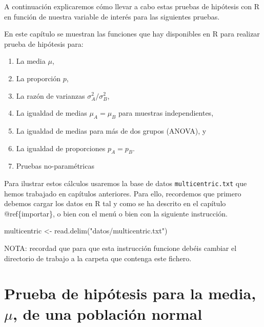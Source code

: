 \documentclass[
]{book}
\newenvironment{Shaded}{\begin{snugshade}}{\end{snugshade}}
\newcommand{\FunctionTok}[1]{\textcolor[rgb]{0.00,0.00,0.00}{#1}}
\newcommand{\NormalTok}[1]{#1}
\newcommand{\OtherTok}[1]{\textcolor[rgb]{0.56,0.35,0.01}{#1}}
\newcommand{\StringTok}[1]{\textcolor[rgb]{0.31,0.60,0.02}{#1}}
\providecommand{\tightlist}{%
  \setlength{\itemsep}{0pt}\setlength{\parskip}{0pt}}
\begin{document}
A continuación explicaremos cómo llevar a cabo estas pruebas de hipótesis con R en función de nuestra variable de interés para las siguientes pruebas.

En este capítulo se muestran las funciones que hay disponibles en R para realizar prueba de hipótesis para:

\begin{enumerate}
\def\labelenumi{\arabic{enumi}.}
\tightlist
\item
  La media \(\mu\),
\item
  La proporción \(p\),
\item
  La razón de varianzas \(\sigma_A^2 / \sigma_B^2\),
\item
  La igualdad de medias \(\mu_A = \mu_B\) para muestras independientes,
\item
  La igualdad de medias para más de dos grupos (ANOVA), y
\item
  La igualdad de proporciones \(p_A = p_B\).
\item
  Pruebas no-paramétricas
\end{enumerate}

Para ilustrar estos cálculos usaremos la base de datos \texttt{multicentric.txt} que hemos trabajado en capítulos anteriores. Para ello, recordemos que primero debemos cargar los datos en R tal y como se ha descrito en el capítulo @ref\{importar\}, o bien con el menú o bien con la siguiente instrucción.

\begin{Shaded}
\begin{Highlighting}[]
\NormalTok{multicentric }\OtherTok{\textless{}{-}} \FunctionTok{read.delim}\NormalTok{(}\StringTok{"datos/multicentric.txt"}\NormalTok{)}
\end{Highlighting}
\end{Shaded}

NOTA: recordad que para que esta instrucción funcione debéis cambiar el directorio de trabajo a la carpeta que contenga este fichero.

\hypertarget{prueba-de-hipuxf3tesis-para-la-media-mu-de-una-poblaciuxf3n-normal}{%
\section{\texorpdfstring{Prueba de hipótesis para la media, \(\mu\), de una población normal}{Prueba de hipótesis para la media, \textbackslash mu, de una población normal}}\label{prueba-de-hipuxf3tesis-para-la-media-mu-de-una-poblaciuxf3n-normal}}
\end{document}
